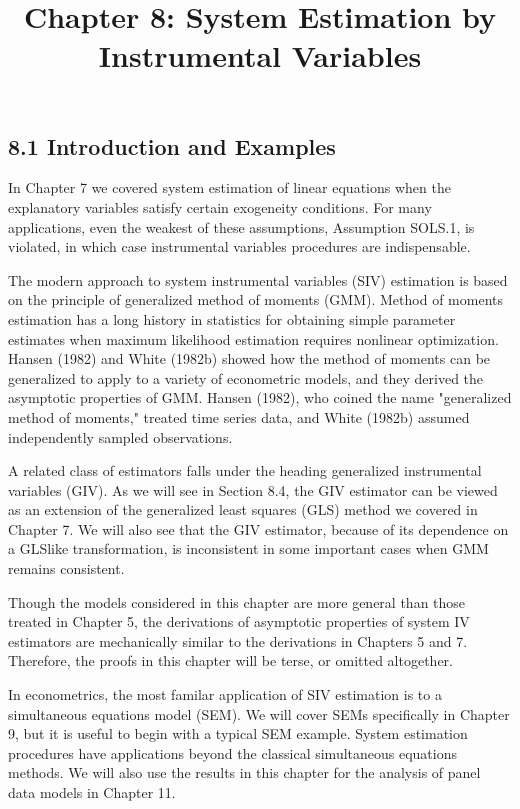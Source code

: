 \documentclass[10pt]{article}
\title{Chapter 8: System Estimation by Instrumental Variables}
\author{}
\date{}
\begin{document}
\maketitle

\subsection*{8.1 Introduction and Examples}
In Chapter 7 we covered system estimation of linear equations when the explanatory variables satisfy certain exogeneity conditions. For many applications, even the weakest of these assumptions, Assumption SOLS.1, is violated, in which case instrumental variables procedures are indispensable.

The modern approach to system instrumental variables (SIV) estimation is based on the principle of generalized method of moments (GMM). Method of moments estimation has a long history in statistics for obtaining simple parameter estimates when maximum likelihood estimation requires nonlinear optimization. Hansen (1982) and White (1982b) showed how the method of moments can be generalized to apply to a variety of econometric models, and they derived the asymptotic properties of GMM. Hansen (1982), who coined the name "generalized method of moments," treated time series data, and White (1982b) assumed independently sampled observations.

A related class of estimators falls under the heading generalized instrumental variables (GIV). As we will see in Section 8.4, the GIV estimator can be viewed as an extension of the generalized least squares (GLS) method we covered in Chapter 7. We will also see that the GIV estimator, because of its dependence on a GLSlike transformation, is inconsistent in some important cases when GMM remains consistent.

Though the models considered in this chapter are more general than those treated in Chapter 5, the derivations of asymptotic properties of system IV estimators are mechanically similar to the derivations in Chapters 5 and 7. Therefore, the proofs in this chapter will be terse, or omitted altogether.

In econometrics, the most familar application of SIV estimation is to a simultaneous equations model (SEM). We will cover SEMs specifically in Chapter 9, but it is useful to begin with a typical SEM example. System estimation procedures have applications beyond the classical simultaneous equations methods. We will also use the results in this chapter for the analysis of panel data models in Chapter 11.
\end{document}
